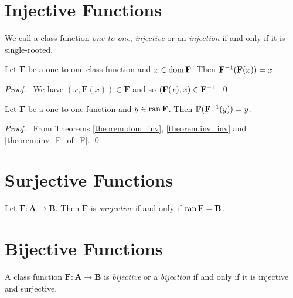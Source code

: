 \section{Injective Functions}

\begin{definition}[Injective]
    We call a class function \emph{one-to-one}, \emph{injective} or an \emph{injection}
     if and only if it is single-rooted.
\end{definition}

\begin{theorem}
    \label{theorem:inv_F_of_F}
    Let $\mathbf{F}$ be a one-to-one class function and $x \in \operatorname{dom} \mathbf{F}$.
    Then ${\mathbf{F}}^{-1}(\mathbf{F}(x)) = x$.
\end{theorem}

\begin{proof}
    \pf\ We have $(x, \mathbf{F}(x)) \in \mathbf{F}$ and so 
    $(\mathbf{F}(x), x) \in {\mathbf{F}}^{-1}$. \qed
\end{proof}

\begin{theorem}
    Let $\mathbf{F}$ be a one-to-one function and $y \in \operatorname{ran} \mathbf{F}$.
    Then $\mathbf{F}({\mathbf{F}}^{-1}(y)) = y$.
\end{theorem}

\begin{proof}
    \pf\ From Theorems \ref{theorem:dom_inv}, \ref{theorem:inv_inv} and \ref{theorem:inv_F_of_F}. \qed
\end{proof}

\section{Surjective Functions}

\begin{definition}[Surjective]
    Let $\mathbf{F} : \mathbf{A} \rightarrow \mathbf{B}$. Then $\mathbf{F}$ is \emph{surjective} if and only if
    $\operatorname{ran} \mathbf{F} = \mathbf{B}$.
\end{definition}

\section{Bijective Functions}

\begin{definition}[Bijective]
    A class function $\mathbf{F} : \mathbf{A} \rightarrow \mathbf{B}$ is
    \emph{bijective} or a \emph{bijection} if and only if it is injective and
    surjective.
\end{definition}

